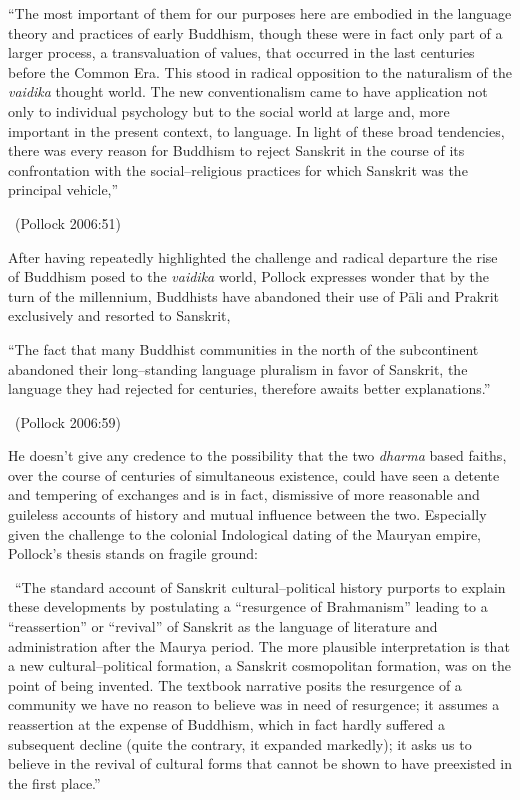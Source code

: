 \begin{myquote}
“The most important of them for our purposes here are embodied in the language theory and practices of early Buddhism, though these were in fact only part of a larger process, a transvaluation of values, that occurred in the last centuries before the Common Era. This stood in radical opposition to the naturalism of the \textit{vaidika} thought world. The new conventionalism came to have application not only to individual psychology but to the social world at large and, more important in the present context, to language. In light of these broad tendencies, there was every reason for Buddhism to reject Sanskrit in the course of its confrontation with the social–religious practices for which Sanskrit was the principal vehicle,” 

~\hfill (Pollock 2006:51)
\end{myquote}

After having repeatedly highlighted the challenge and radical departure the rise of Buddhism posed to the \textit{vaidika} world, Pollock expresses wonder that by the turn of the millennium, Buddhists have abandoned their use of Pāli and Prakrit exclusively and resorted to Sanskrit,

\begin{myquote}
“The fact that many Buddhist communities in the north of the subcontinent abandoned their long–standing language pluralism in favor of Sanskrit, the language they had rejected for centuries, therefore awaits better explanations.” 

~\hfill (Pollock 2006:59)
\end{myquote}

He doesn’t give any credence to the possibility that the two \textit{dharma} based faiths, over the course of centuries of simultaneous existence, could have seen a detente and tempering of exchanges and is in fact, dismissive of more reasonable and guileless accounts of history and mutual influence between the two. Especially given the challenge to the colonial Indological dating of the Mauryan empire, Pollock’s thesis stands on fragile ground:

~\hfill “The standard account of Sanskrit cultural–political history purports to explain these developments by postulating a “resurgence of Brahmanism” leading to a “reassertion” or “revival” of Sanskrit as the language of literature and administration after the Maurya period. The more plausible interpretation is that a new cultural–political formation, a Sanskrit cosmopolitan formation, was on the point of being invented. The textbook narrative posits the resurgence of a community we have no reason to believe was in need of resurgence; it assumes a reassertion at the expense of Buddhism, which in fact hardly suffered a subsequent decline (quite the contrary, it expanded markedly); it asks us to believe in the revival of cultural forms that cannot be shown to have preexisted in the first place.” 

